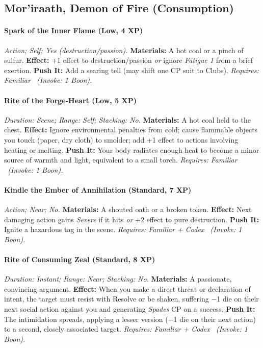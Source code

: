 \documentclass[12pt,twoside]{book}
\begin{document}
\subsection{Mor’iraath, Demon of Fire (Consumption)}
\paragraph{Spark of the Inner Flame (Low, 4 XP)} \emph{Action; Self; Yes (destruction/passion).}
\textbf{Materials:} A hot coal or a pinch of sulfur.
\textbf{Effect:} +1 effect to destruction/passion \emph{or} ignore \emph{Fatigue 1} from a brief exertion.
\textbf{Push It:} Add a searing tell (may shift one CP suit to Clubs).
\emph{Requires: Familiar \ (\textit{Invoke:} 1 Boon).}
\paragraph{Rite of the Forge-Heart (Low, 5 XP)} \emph{Duration: Scene; Range: Self; Stacking: No.}
\textbf{Materials:} A hot coal held to the chest.
\textbf{Effect:} Ignore environmental penalties from cold; cause flammable objects you touch (paper, dry cloth) to smolder; add +1 effect to actions involving heating or melting.
\textbf{Push It:} Your body radiates enough heat to become a minor source of warmth and light, equivalent to a small torch.
\emph{Requires: Familiar \ (\textit{Invoke:} 1 Boon).}
\paragraph{Kindle the Ember of Annihilation (Standard, 7 XP)} \emph{Action; Near; No.}
\textbf{Materials:} A shouted oath or a broken token.
\textbf{Effect:} Next damaging action gains \emph{Severe} if it hits \emph{or} +2 effect to pure destruction.
\textbf{Push It:} Ignite a hazardous tag in the scene.
\emph{Requires: Familiar + Codex \ (\textit{Invoke:} 1 Boon).}
\paragraph{Rite of Consuming Zeal (Standard, 8 XP)} \emph{Duration: Instant; Range: Near; Stacking: No.}
\textbf{Materials:} A passionate, convincing argument.
\textbf{Effect:} When you make a direct threat or declaration of intent, the target must resist with Resolve or be shaken, suffering −1 die on their next social action against you and generating \emph{Spades} CP on a success.
\textbf{Push It:} The intimidation spreads, applying a lesser version (−1 die on their next action) to a second, closely associated target.
\emph{Requires: Familiar + Codex \ (\textit{Invoke:} 1 Boon).}
\end{document}
